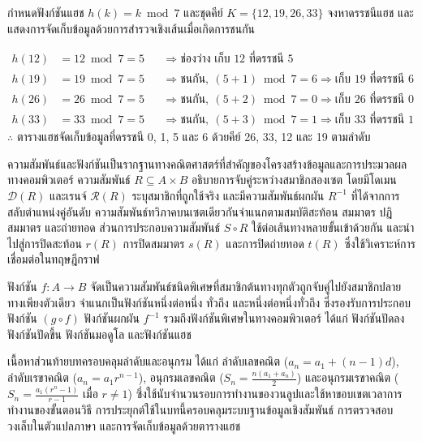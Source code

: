 \begin{ex}
\label{ex:hash-table-linear-probing}
กำหนดฟังก์ชันแฮช $h(k) = k \bmod 7$ และชุดคีย์ $K = \{12, 19, 26, 33\}$ จงหาดรรชนีแฮช และแสดงการจัดเก็บข้อมูลด้วยการสำรวจเชิงเส้นเมื่อเกิดการชนกัน
\end{ex}
\begin{solution}
\begin{align*}
h(12) &= 12 \bmod 7 = 5 &&\Rightarrow \text{ช่องว่าง เก็บ } 12 \text{ ที่ดรรชนี } 5\\
h(19) &= 19 \bmod 7 = 5 &&\Rightarrow \text{ชนกัน}, \ (5+1) \bmod 7 = 6 \Rightarrow \text{เก็บ } 19 \text{ ที่ดรรชนี } 6\\
h(26) &= 26 \bmod 7 = 5 &&\Rightarrow \text{ชนกัน}, \ (5+2) \bmod 7 = 0 \Rightarrow \text{เก็บ } 26 \text{ ที่ดรรชนี } 0\\
h(33) &= 33 \bmod 7 = 5 &&\Rightarrow \text{ชนกัน}, \ (5+3) \bmod 7 = 1 \Rightarrow \text{เก็บ } 33 \text{ ที่ดรรชนี } 1
\end{align*}
$\therefore$ ตารางแฮชจัดเก็บข้อมูลที่ดรรชนี 0, 1, 5 และ 6 ด้วยคีย์ 26, 33, 12 และ 19 ตามลำดับ \solhere
\end{solution}

ความสัมพันธ์และฟังก์ชันเป็นรากฐานทางคณิตศาสตร์ที่สำคัญของโครงสร้างข้อมูลและการประมวลผลทางคอมพิวเตอร์ ความสัมพันธ์ $R \subseteq A \times B$ อธิบายการจับคู่ระหว่างสมาชิกสองเซต โดยมีโดเมน $\mathcal{D}(R)$ และเรนจ์ $\mathcal{R}(R)$ ระบุสมาชิกที่ถูกใช้จริง และมีความสัมพันธ์ผกผัน $R^{-1}$ ที่ได้จากการสลับตำแหน่งคู่อันดับ ความสัมพันธ์ทวิภาคบนเซตเดียวกันจำแนกตามสมบัติสะท้อน สมมาตร ปฏิสมมาตร และถ่ายทอด ส่วนการประกอบความสัมพันธ์ $S \circ R$ ใช้ต่อเส้นทางหลายขั้นเข้าด้วยกัน และนำไปสู่การปิดสะท้อน $r(R)$ การปิดสมมาตร $s(R)$ และการปิดถ่ายทอด $t(R)$ ซึ่งใช้วิเคราะห์การเชื่อมต่อในทฤษฎีกราฟ

ฟังก์ชัน $f: A \to B$ จัดเป็นความสัมพันธ์ชนิดพิเศษที่สมาชิกต้นทางทุกตัวถูกจับคู่ไปยังสมาชิกปลายทางเพียงตัวเดียว จำแนกเป็นฟังก์ชันหนึ่งต่อหนึ่ง ทั่วถึง และหนึ่งต่อหนึ่งทั่วถึง ซึ่งรองรับการประกอบฟังก์ชัน $(g \circ f)$ ฟังก์ชันผกผัน $f^{-1}$ รวมถึงฟังก์ชันพิเศษในทางคอมพิวเตอร์ ได้แก่ ฟังก์ชันปัดลง ฟังก์ชันปัดขึ้น ฟังก์ชันมอดูโล และฟังก์ชันแฮช

เนื้อหาส่วนท้ายบทครอบคลุมลำดับและอนุกรม ได้แก่ ลำดับเลขคณิต ($a_n = a_1 + (n-1)d$), ลำดับเรขาคณิต ($a_n = a_1 r^{n-1}$), อนุกรมเลขคณิต ($S_n = \frac{n(a_1+a_n)}{2}$) และอนุกรมเรขาคณิต ($S_n = \frac{a_1(r^n-1)}{r-1}$ เมื่อ $r \neq 1$) ซึ่งใช้นับจำนวนรอบการทำงานของวนลูปและใช้หาขอบเขตเวลาการทำงานของขั้นตอนวิธี การประยุกต์ใช้ในบทนี้ครอบคลุมระบบฐานข้อมูลเชิงสัมพันธ์ การตรวจสอบวงเล็บในตัวแปลภาษา และการจัดเก็บข้อมูลด้วยตารางแฮช

